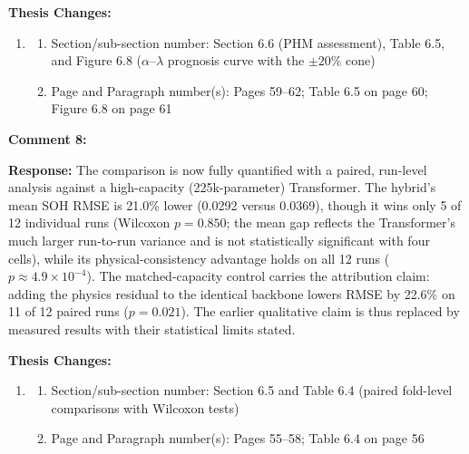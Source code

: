 \documentclass[12pt,a4paper]{article}
\begin{document}
\vspace{\baselineskip}

\textbf{Thesis Changes:}

\begin{enumerate}
    \item
    \begin{enumerate}
        \item Section/sub-section number: Section 6.6 (PHM assessment), Table 6.5, and Figure 6.8 ($\alpha$--$\lambda$ prognosis curve with the $\pm 20\%$ cone)
        \item Page and Paragraph number(s): Pages 59--62; Table 6.5 on page 60; Figure 6.8 on page 61
    \end{enumerate}
\end{enumerate}

\vspace{\baselineskip}

\textbf{Comment 8:} 

\vspace{\baselineskip}

\textbf{Response:} The comparison is now fully quantified with a paired,
run-level analysis against a high-capacity (225k-parameter) Transformer. The
hybrid's mean SOH RMSE is 21.0\% lower (0.0292 versus 0.0369), though it wins
only 5 of 12 individual runs (Wilcoxon $p = 0.850$; the mean gap reflects the
Transformer's much larger run-to-run variance and is not statistically
significant with four cells), while its physical-consistency advantage holds on
all 12 runs ($p \approx 4.9 \times 10^{-4}$). The matched-capacity control
carries the attribution claim: adding the physics residual to the identical
backbone lowers RMSE by 22.6\% on 11 of 12 paired runs ($p = 0.021$). The
earlier qualitative claim is thus replaced by measured results with their
statistical limits stated.

\vspace{\baselineskip}

\textbf{Thesis Changes:}

\begin{enumerate}
    \item
    \begin{enumerate}
        \item Section/sub-section number: Section 6.5 and Table 6.4 (paired fold-level comparisons with Wilcoxon tests)
        \item Page and Paragraph number(s): Pages 55--58; Table 6.4 on page 56
    \end{enumerate}
\end{enumerate}
\end{document}

